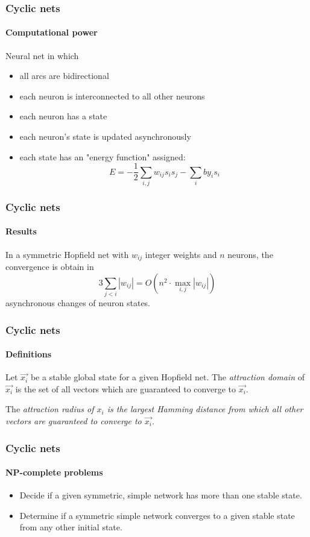 \documentclass{beamer}
\begin{document}
\begin{frame}
\frametitle{Cyclic nets}
\framesubtitle{Computational power}
\begin{definition}
Neural net in which
\begin{itemize}
	\item all arcs are bidirectional
	\item each neuron is interconnected to all other neurons
	\item each neuron has a state
	\item each neuron's state is updated asynchronously
	\item each state has an "energy function" assigned: \[E=-\frac{1}{2}\sum_{i,j}w_{ij}s_is_j-\sum_iby_is_i \]
\end{itemize}
\end{definition}
\end{frame}

\begin{frame}
\frametitle{Cyclic nets}
\framesubtitle{Results}
\begin{theorem}
	In a symmetric Hopfield net with $w_{ij}$ integer weights and $n$ neurons, the convergence is obtain in 
	\[
	3 \sum_{j<i} |w_{ij}| = O(n^2 \cdot \max_{i,j} |w_{ij}|)
	\]
	asynchronous changes of neuron states.
\end{theorem}
\end{frame}

\begin{frame}
	\frametitle{Cyclic nets}
	\framesubtitle{Definitions}
	\begin{definition}
		Let $\vec{x_i}$ be a stable global state for a given Hopfield net. The \textit{attraction domain} \rm of $\vec{x_i}$ is the set of all vectors which are guaranteed to converge to $\vec{x_i}.$
	\end{definition}
	\begin{definition}
		The \it attraction radius \rm of $x_i$ is the largest Hamming distance from which all other vectors are guaranteed to converge to $\vec{x_i}.$
	\end{definition}
\end{frame}


\begin{frame}
\frametitle{Cyclic nets}
\framesubtitle{NP-complete problems}
	\begin{itemize}
		\item Decide if a given symmetric, simple network has more than one stable state.
		\item Determine if a symmetric simple network converges to a given stable state from any other initial state.
	\end{itemize}
\end{frame}
\end{document}
